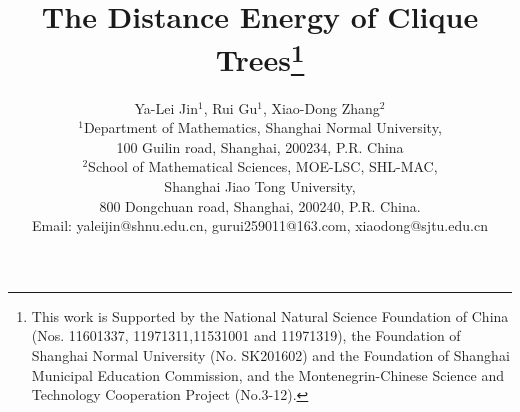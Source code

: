 \documentclass[10pt]{article}
\begin{document}
\newtheorem{theorem}{Theorem}[section]
\newtheorem{corollary}[theorem]{Corollary}
\newtheorem{definition}[theorem]{Definition}
\newtheorem{conjecture}[theorem]{Conjecture}
\newtheorem{question}[theorem]{Question}
\newtheorem{lemma}[theorem]{Lemma}
\newtheorem{remark}[theorem]{Remark}
\newtheorem{proposition}[theorem]{Proposition}
\newtheorem{example}[theorem]{Example}
\newenvironment{proof}{\noindent {\bf
Proof.}}{\rule{3mm}{3mm}\par\medskip}
\newcommand{\pp}{{\it p.}}
\newcommand{\de}{\em}

\newcommand{\JEC}{{\it Europ. J. Combinatorics},  }
\newcommand{\JCTB}{{\it J. Combin. Theory Ser. B.}, }
\newcommand{\JCT}{{\it J. Combin. Theory}, }
\newcommand{\JGT}{{\it J. Graph Theory}, }
\newcommand{\ComHung}{{\it Combinatorica}, }
\newcommand{\DM}{{\it Discrete Math.}, }
\newcommand{\ARS}{{\it Ars Combin.}, }
\newcommand{\SIAMDM}{{\it SIAM J. Discrete Math.}, }
\newcommand{\SIAMADM}{{\it SIAM J. Algebraic Discrete Methods}, }
\newcommand{\SIAMC}{{\it SIAM J. Comput.}, }
\newcommand{\ConAMS}{{\it Contemp. Math. AMS}, }
\newcommand{\TransAMS}{{\it Trans. Amer. Math. Soc.}, }
\newcommand{\AnDM}{{\it Ann. Discrete Math.}, }
\newcommand{\NBS}{{\it J. Res. Nat. Bur. Standards} {\rm B}, }
\newcommand{\ConNum}{{\it Congr. Numer.}, }
\newcommand{\CJM}{{\it Canad. J. Math.}, }
\newcommand{\JLMS}{{\it J. London Math. Soc.}, }
\newcommand{\PLMS}{{\it Proc. London Math. Soc.}, }
\newcommand{\PAMS}{{\it Proc. Amer. Math. Soc.}, }
\newcommand{\JCMCC}{{\it J. Combin. Math. Combin. Comput.}, }
\newcommand{\GC}{{\it Graphs Combin.}, }
\title{The Distance Energy of  Clique Trees\thanks{ This work is Supported by the National Natural Science Foundation of China (Nos. 11601337, 11971311,11531001 and 11971319), the Foundation of Shanghai Normal University (No. SK201602) and the Foundation of Shanghai Municipal Education Commission,  and the Montenegrin-Chinese Science and Technology Cooperation Project (No.3-12).}}
\author{
Ya-Lei Jin$^1$, Rui Gu$^1$, Xiao-Dong Zhang$^2$ \\
$^1$Department of Mathematics,
Shanghai Normal University, \\
 100 Guilin road, Shanghai, 200234, P.R. China
\\
$^2$School of Mathematical Sciences, MOE-LSC, SHL-MAC,\\ Shanghai Jiao Tong University,
\\ 800 Dongchuan road, Shanghai, 200240,  P.R. China.
\\
Email: yaleijin@shnu.edu.cn, gurui259011@163.com, xiaodong@sjtu.edu.cn
 }
\end{document}
